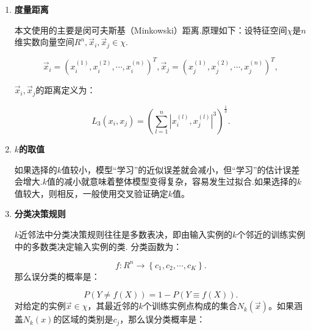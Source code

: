 \begin{enumerate}
    \item \textbf{度量距离}
  
    本文使用的主要是闵可夫斯基（Minkowski）距离.原理如下：设特征空间$\chi$是$n$维实数向量空间${{R}^{n}},{{\overrightarrow{x}}_{i}},{{\overrightarrow{x}}_{j}}\in \chi .$
  
    \begin{equation}
        {{\overrightarrow{x}}_{i}}={{\left( x_{i}^{\left( 1 \right)},x_{i}^{\left( 2 \right)},\cdots ,x_{i}^{\left( n \right)} \right)}^{T}},{{\overrightarrow{x}}_{j}}={{\left( x_{j}^{\left( 1 \right)},x_{j}^{\left( 2 \right)},\cdots ,x_{j}^{\left( n\right)} \right)}^{T}},
    \end{equation}

    ${\overrightarrow{x}_{i}},{\overrightarrow{x}_{j}}$的距离定义为：

    \begin{equation}
        {{L}_{3}}\left( {{x}_{i}},{{x}_{j}} \right)={{\left( \sum\limits_{l=1}^{n}{{{\left| x_{i}^{\left( l \right)},x_{j}^{\left( l \right)} \right|}^{3}}} \right)}^{\frac{1}{3}}}.
    \end{equation}

    \item \textbf{$k$的取值}
    
    如果选择的$k$值较小，模型“学习”的近似误差就会减小，但“学习”的估计误差会增大.$k$值的减小就意味着整体模型变得复杂，容易发生过拟合.如果选择的$k$值较大，则相反，一般使用交叉验证确定$k$值。
    
    \item \textbf{分类决策规则}
    
    
    $k$近邻法中分类决策规则往往是多数表决，即由输入实例的$k$个邻近的训练实例中的多数类决定输入实例的类.
    分类函数为：
    
    \begin{equation}
        f:{{R}^{n}}\to \left\{ {{c}_{1}},{{c}_{2}},\cdots ,{{c}_{K}} \right\}.
    \end{equation}
    那么误分类的概率是：
    
    \begin{equation}
        P\left( Y\ne f\left( X \right) \right)=1-P\left( Y\equiv f\left( X \right) \right).
    \end{equation}
    对给定的实例$\overrightarrow{x}\in \chi$，其最近邻的$k$个训练实例点构成的集合${{N}_{k}}\left( \overrightarrow{x} \right)$。如果涵盖${{N}_{k}}\left( x \right)$的区域的类别是${{c}_{j}}$，那么误分类概率是：
    

\end{enumerate}
